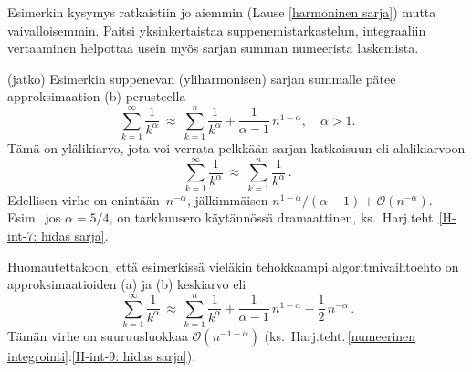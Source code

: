 Esimerkin kysymys ratkaistiin jo aiemmin (Lause \ref{harmoninen sarja}) mutta vaivalloisemmin.
Paitsi yksinkertaistaa suppenemistarkastelun, integraaliin vertaaminen helpottaa usein myös
sarjan summan numeerista laskemista.
\jatko \begin{Exa} (jatko) Esimerkin suppenevan (yliharmonisen) sarjan summalle pätee
approksimaation (b) perusteella
\[
\sum_{k=1}^\infty\frac{1}{k^\alpha}\ 
   \approx\ \sum_{k=1}^n\frac{1}{k^\alpha}+\frac{1}{\alpha-1}\,n^{1-\alpha}, \quad \alpha>1.
\]
Tämä on ylälikiarvo, jota voi verrata pelkkään sarjan katkaisuun eli alalikiarvoon
\[
\sum_{k=1}^\infty\frac{1}{k^\alpha}\ \approx\ \sum_{k=1}^n\frac{1}{k^\alpha}\,.
\]
Edellisen virhe on enintään $\,n^{-\alpha}$, jälkimmäisen 
$n^{1-\alpha}/(\alpha-1)+\mathcal{O}(n^{-\alpha})$. Esim.\ jos $\alpha=5/4$, on tarkkuusero
käytännössä dramaattinen, ks.\ Harj.teht.\,\ref{H-int-7: hidas sarja}. \loppu
\end{Exa}
Huomautettakoon, että esimerkissä vieläkin tehokkaampi algoritmivaihtoehto on
approksimaatioiden (a) ja (b) keskiarvo eli
\[
\sum_{k=1}^\infty \frac{1}{k^\alpha} \,\approx\,
\sum_{k=1}^n\frac{1}{k^\alpha}+\frac{1}{\alpha-1}\,n^{1-\alpha}-\frac{1}{2}\,n^{-\alpha}\,.
\]
Tämän virhe on suuruusluokkaa $\mathcal{O}(n^{-1-\alpha})$
(ks.\ Harj.teht.\,\ref{numeerinen integrointi}:\ref{H-int-9: hidas sarja}).

\pagebreak

